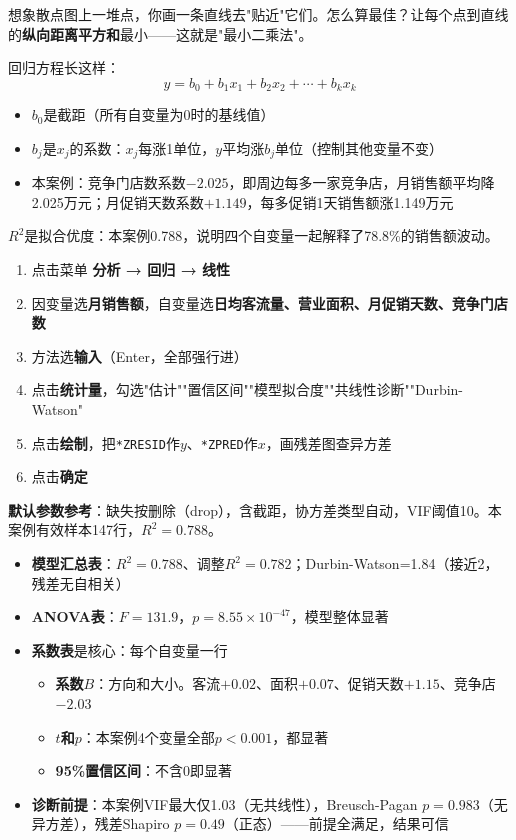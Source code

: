 \begin{algoprinciple}
想象散点图上一堆点，你画一条直线去"贴近"它们。怎么算最佳？让每个点到直线的\textbf{纵向距离平方和}最小——这就是"最小二乘法"。

回归方程长这样：
$$y = b_0 + b_1 x_1 + b_2 x_2 + \cdots + b_k x_k$$
\begin{itemize}
    \item $b_0$是截距（所有自变量为0时的基线值）
    \item $b_j$是$x_j$的系数：$x_j$每涨1单位，$y$平均涨$b_j$单位（控制其他变量不变）
    \item 本案例：竞争门店数系数$-2.025$，即周边每多一家竞争店，月销售额平均降2.025万元；月促销天数系数$+1.149$，每多促销1天销售额涨1.149万元
\end{itemize}

\textbf{$R^2$}是拟合优度：本案例0.788，说明四个自变量一起解释了78.8\%的销售额波动。
\end{algoprinciple}

\begin{algosposs}
\begin{enumerate}
    \item 点击菜单 \textbf{分析 → 回归 → 线性}
    \item 因变量选\textbf{月销售额}，自变量选\textbf{日均客流量、营业面积、月促销天数、竞争门店数}
    \item 方法选\textbf{输入}（Enter，全部强行进）
    \item 点击\textbf{统计量}，勾选"估计""置信区间""模型拟合度""共线性诊断""Durbin-Watson"
    \item 点击\textbf{绘制}，把\verb|*ZRESID|作$y$、\verb|*ZPRED|作$x$，画残差图查异方差
    \item 点击\textbf{确定}
\end{enumerate}

\textbf{默认参数参考}：缺失按删除（drop），含截距，协方差类型自动，VIF阈值10。本案例有效样本147行，$R^2=0.788$。
\end{algosposs}

\begin{algoresult}
\begin{itemize}
    \item \textbf{模型汇总表}：$R^2=0.788$、调整$R^2=0.782$；Durbin-Watson=1.84（接近2，残差无自相关）
    \item \textbf{ANOVA表}：$F=131.9$，$p=8.55\times10^{-47}$，模型整体显著
    \item \textbf{系数表}是核心：每个自变量一行
    \begin{itemize}
        \item \textbf{系数$B$}：方向和大小。客流$+0.02$、面积$+0.07$、促销天数$+1.15$、竞争店$-2.03$
        \item \textbf{$t$和$p$}：本案例4个变量全部$p<0.001$，都显著
        \item \textbf{95\%置信区间}：不含0即显著
    \end{itemize}
    \item \textbf{诊断前提}：本案例VIF最大仅1.03（无共线性），Breusch-Pagan $p=0.983$（无异方差），残差Shapiro $p=0.49$（正态）——前提全满足，结果可信
\end{itemize}
\end{algoresult}

